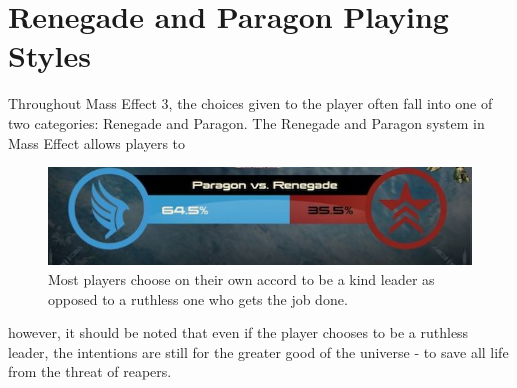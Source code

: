 \documentclass[journal]{IEEEtran}
\begin{document}
\section{Renegade and Paragon Playing Styles}
Throughout Mass Effect 3, the choices given to the player often fall into one
of two categories: Renegade and Paragon. The Renegade and Paragon system in
Mass Effect allows players to
%
%
%

\begin{figure}[h!]
 \includegraphics[width=.5\textwidth]{paragon}
 \caption{Most players choose on their own accord to be a kind leader as opposed to a ruthless one who gets the job done. \cite{ea}}
\end{figure}
however, it should be noted that even if the player chooses to be a ruthless leader, the intentions are still for the greater good of the universe - to save
all life from the threat of reapers.
\end{document}
